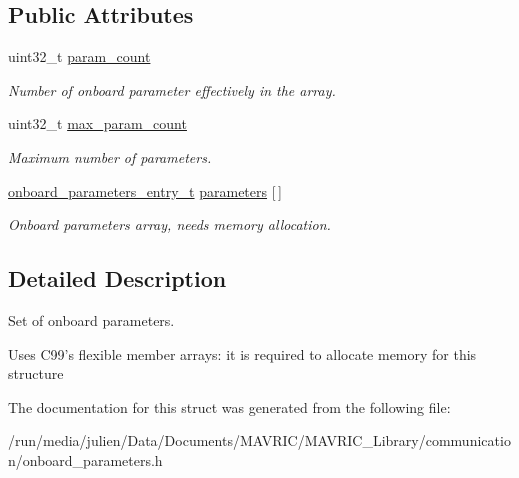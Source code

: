 \subsection*{Public Attributes}
\begin{DoxyCompactItemize}
\item 
\hypertarget{structonboard__parameters__set__t_a5daa0bd89790305ff72ed414a071f5d8}{uint32\+\_\+t \hyperlink{structonboard__parameters__set__t_a5daa0bd89790305ff72ed414a071f5d8}{param\+\_\+count}}\label{structonboard__parameters__set__t_a5daa0bd89790305ff72ed414a071f5d8}

\begin{DoxyCompactList}\small\item\em Number of onboard parameter effectively in the array. \end{DoxyCompactList}\item 
\hypertarget{structonboard__parameters__set__t_a4a2174db1c81f2f7babce7d064f7de81}{uint32\+\_\+t \hyperlink{structonboard__parameters__set__t_a4a2174db1c81f2f7babce7d064f7de81}{max\+\_\+param\+\_\+count}}\label{structonboard__parameters__set__t_a4a2174db1c81f2f7babce7d064f7de81}

\begin{DoxyCompactList}\small\item\em Maximum number of parameters. \end{DoxyCompactList}\item 
\hypertarget{structonboard__parameters__set__t_a4dbf7ed3c8c5152cedf74028d8b7abfb}{\hyperlink{structonboard__parameters__entry__t}{onboard\+\_\+parameters\+\_\+entry\+\_\+t} \hyperlink{structonboard__parameters__set__t_a4dbf7ed3c8c5152cedf74028d8b7abfb}{parameters} \mbox{[}$\,$\mbox{]}}\label{structonboard__parameters__set__t_a4dbf7ed3c8c5152cedf74028d8b7abfb}

\begin{DoxyCompactList}\small\item\em Onboard parameters array, needs memory allocation. \end{DoxyCompactList}\end{DoxyCompactItemize}


\subsection{Detailed Description}
Set of onboard parameters. 

Uses C99's flexible member arrays\+: it is required to allocate memory for this structure 

The documentation for this struct was generated from the following file\+:\begin{DoxyCompactItemize}
\item 
/run/media/julien/\+Data/\+Documents/\+M\+A\+V\+R\+I\+C/\+M\+A\+V\+R\+I\+C\+\_\+\+Library/communication/onboard\+\_\+parameters.\+h\end{DoxyCompactItemize}
